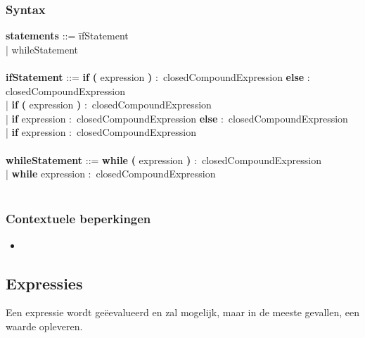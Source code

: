     \subsubsection{Syntax}
        \begin{tabbing}
        {\bf statements}                  ::= \=ifStatement\\
                                          \>| whileStatement\\
        \\
        {\bf ifStatement}                 ::= \=\textbf{if} \=\textbf{(} expression \textbf{)} $\colon$ closedCompoundExpression \textbf    {else} $\colon$ closedCompoundExpression\\
                                      \>| \textbf{if} \textbf{(} expression \textbf{)} $\colon$ closedCompoundExpression\\
                                      \>| \textbf{if} expression $\colon$ closedCompoundExpression \textbf{else} $\colon$ closedCompoundExpression\\
                                      \>| \textbf{if} expression $\colon$ closedCompoundExpression\\
        \\
        {\bf whileStatement}              ::= \=\textbf{while} \textbf{(} expression \textbf{)} $\colon$ closedCompoundExpression\\
                                      \>| \textbf{while} expression $\colon$ closedCompoundExpression\\
        \\ 
        \end{tabbing}
    \subsubsection{Contextuele beperkingen}
        \begin{itemize}
        \item 
        \end{itemize}

\subsection{Expressies}
Een expressie wordt ge\"{e}evalueerd en zal mogelijk, maar in de meeste gevallen, een waarde opleveren.
